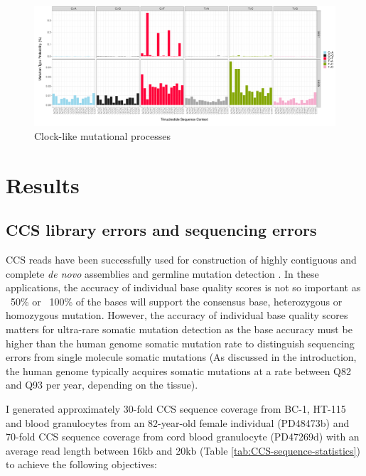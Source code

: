\begin{figure}[htbp!]
\caption{Clock-like mutational processes}
\label{figure:clock-like-mutagenesis}
\begin{centering}
\includegraphics[width=\textwidth]{Vector/SBS1_SBS5_sbs96.pdf}
\end{centering}
\end{figure}

\pagebreak

\section{Results}

\subsection{CCS library errors and sequencing errors}

CCS reads have been successfully used for construction of highly contiguous and complete \textit{de novo} assemblies \cite{Wenger2019-pw} and germline mutation detection \cite{Poplin2018-ub}. In these applications, the accuracy of individual base quality scores is not so important as ~50\% or ~100\% of the bases will support the consensus base, heterozygous or homozygous mutation. However, the accuracy of individual base quality scores matters for ultra-rare somatic mutation detection as the base accuracy must be higher than the human genome somatic mutation rate to distinguish sequencing errors from single molecule somatic mutations (As discussed in the introduction, the human genome typically acquires somatic mutations at a rate between Q82 and Q93 per year, depending on the tissue). 

I generated approximately 30-fold CCS sequence coverage from BC-1, HT-115 and blood granulocytes from an 82-year-old female individual (PD48473b) and 70-fold CCS sequence coverage from cord blood granulocyte (PD47269d) with an average read length between 16kb and 20kb (Table \ref{tab:CCS-sequence-statistics}) to achieve the following objectives: 


